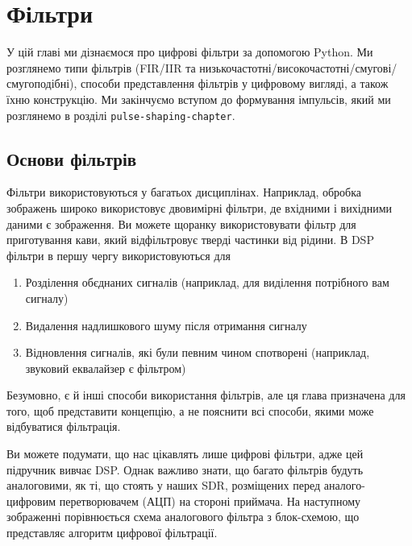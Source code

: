\chapter{Фільтри}\label{filters-chapter}

У цій главі ми дізнаємося про цифрові фільтри за допомогою Python. Ми
розглянемо типи фільтрів (FIR/IIR та
низькочастотні/високочастотні/смугові/смугоподібні), способи
представлення фільтрів у цифровому вигляді, а також їхню конструкцію. Ми
закінчуємо вступом до формування імпульсів, який ми розглянемо в розділі
\texttt{pulse-shaping-chapter}.

\section{Основи
фільтрів}\label{ux43eux441ux43dux43eux432ux438-ux444ux456ux43bux44cux442ux440ux456ux432}

Фільтри використовуються у багатьох дисциплінах. Наприклад, обробка
зображень широко використовує двовимірні фільтри, де вхідними і
вихідними даними є зображення. Ви можете щоранку використовувати фільтр
для приготування кави, який відфільтровує тверді частинки від рідини. В
DSP фільтри в першу чергу використовуються для

\begin{enumerate}
\def\labelenumi{\arabic{enumi}.}
\tightlist
\item
  Розділення об\textquotesingle єднаних сигналів (наприклад, для
  виділення потрібного вам сигналу)
\item
  Видалення надлишкового шуму після отримання сигналу
\item
  Відновлення сигналів, які були певним чином спотворені (наприклад,
  звуковий еквалайзер є фільтром)
\end{enumerate}

Безумовно, є й інші способи використання фільтрів, але ця глава
призначена для того, щоб представити концепцію, а не пояснити всі
способи, якими може відбуватися фільтрація.

Ви можете подумати, що нас цікавлять лише цифрові фільтри, адже цей
підручник вивчає DSP. Однак важливо знати, що багато фільтрів будуть
аналоговими, як ті, що стоять у наших SDR, розміщених перед
аналого-цифровим перетворювачем (АЦП) на стороні приймача. На наступному
зображенні порівнюється схема аналогового фільтра з блок-схемою, що
представляє алгоритм цифрової фільтрації.

